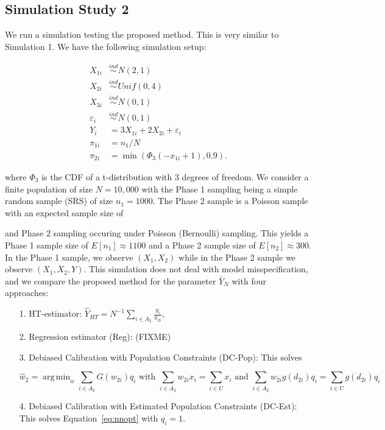 \documentclass[12pt]{article}
\DeclareMathOperator*{\argmin}{arg\,min}
\begin{document}
\subsection{Simulation Study 2}

We run a simulation testing the proposed method. This is very similar to
Simulation 1. We have the following simulation setup:

$$
\begin{aligned}
X_{1i} &\stackrel{ind}{\sim} N(2, 1) \\
X_{2i} &\stackrel{ind}{\sim} Unif(0, 4) \\
X_{3i} &\stackrel{ind}{\sim} N(0, 1) \\
\varepsilon_i &\stackrel{ind}{\sim} N(0, 1) \\
Y_{i} &= 3 X_{1i} + 2 X_{2i} + \varepsilon_i \\
\pi_{1i} &= n_1 / N \\
\pi_{2i} &= \min(\Phi_3(-x_{1i} + 1), 0.9).
\end{aligned}
$$

where $\Phi_3$ is the CDF of a t-distribution with 3 degrees of freedom.
We consider a finite population of size $N = 10,000$ with the Phase 1 
sampling being a simple random sample (SRS) of size $n_1 = 1000$. The Phase 2
sample is a Poisson sample with an expected sample size of 

and
Phase 2 sampling occuring under Poisson (Bernoulli) sampling. This yields a
Phase 1 sample
size of $E[n_1] \approx 1100$ and a Phase 2 sample size of
$E[n_2] \approx 300$. In the Phase 1 sample, we observe 
$(X_1, X_2)$ while in the Phase 2 sample we observe $(X_1, X_2, Y)$. This
simulation does not deal with model misspecification, and we compare the
proposed method for the parameter $\bar Y_N$ with four approaches:

\begin{itemize}
  \item[1.] HT-estimator: $\hat Y_{HT} = N^{-1} \sum_{i \in A_2}
    \frac{y_i}{\pi_{2i}},$
  \item[2.] Regression estimator (Reg): (FIXME)
  \item[3.] Debiased Calibration with Population Constraints (DC-Pop): This 
    solves 

  \begin{equation*}
  \hat w_2 = \argmin_w \sum_{i \in A_2} G(w_{2i}) q_i \text{ with } 
  \sum_{i \in A_2} w_{2i} x_i = \sum_{i \in U} x_i \text{ and } 
  \sum_{i \in A_2} w_{2i} g(d_{2i}) q_i = \sum_{i \in U} g(d_{2i}) q_i
  \end{equation*}

  \item[4.] Debiased Calibration with Estimated Population Constraints (DC-Est):
    This solves Equation~\eqref{eq:nnopt} with $q_i = 1$.
\end{itemize}
\end{document}
